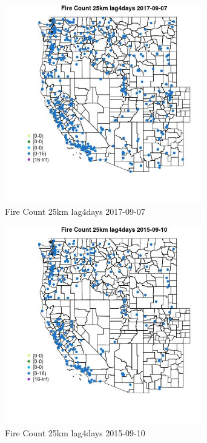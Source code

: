\begin{figure} 
\centering  
\includegraphics[width=0.77\textwidth]{Code_Outputs/Report_ML_input_PM25_Step4_part_e_de_duplicated_aves_compiled_2019-05-21wNAs_MapObsFire_Count_25km_lag4days2017-09-07.jpg} 
\caption{\label{fig:Report_ML_input_PM25_Step4_part_e_de_duplicated_aves_compiled_2019-05-21wNAsMapObsFire_Count_25km_lag4days2017-09-07}Fire Count 25km lag4days 2017-09-07} 
\end{figure} 
 

\begin{figure} 
\centering  
\includegraphics[width=0.77\textwidth]{Code_Outputs/Report_ML_input_PM25_Step4_part_e_de_duplicated_aves_compiled_2019-05-21wNAs_MapObsFire_Count_25km_lag4days2015-09-10.jpg} 
\caption{\label{fig:Report_ML_input_PM25_Step4_part_e_de_duplicated_aves_compiled_2019-05-21wNAsMapObsFire_Count_25km_lag4days2015-09-10}Fire Count 25km lag4days 2015-09-10} 
\end{figure} 
 

